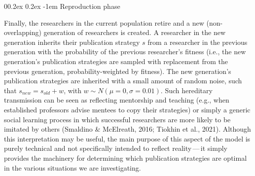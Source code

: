 \documentclass[
  ,man,mask,floatsintext]{apa6}
\makeatletter
\let\oldparagraph\paragraph
\renewcommand{\paragraph}[1]{\oldparagraph{#1}\mbox{}}
\renewcommand{\paragraph}{\@startsection{paragraph}{4}{\parindent}%
  {0\baselineskip \@plus 0.2ex \@minus 0.2ex}%
  {-1em}%
  {\normalfont\normalsize\bfseries\itshape\typesectitle}}
\makeatother
\begin{document}
\hypertarget{reproduction-phase}{%
\paragraph{Reproduction phase}\label{reproduction-phase}}

Finally, the researchers in the current population retire and a new (non-overlapping) generation of researchers is created.
A researcher in the new generation inherits their publication strategy \(s\) from a researcher in the previous generation with the probability of the previous researcher's fitness (i.e., the new generation's publication strategies are sampled with replacement from the previous generation, probability-weighted by fitness).
The new generation's publication strategies are inherited with a small amount of random noise, such that \(s_{new} = s_{old} + w\), with \(w \sim N(\mu = 0, \sigma = 0.01)\).
Such hereditary transmission can be seen as reflecting mentorship and teaching (e.g., when established professors advise mentees to copy their strategies) or simply a generic social learning process in which successful researchers are more likely to be imitated by others (Smaldino \& McElreath, 2016; Tiokhin et al., 2021).
Although this interpretation may be useful, the main purpose of this aspect of the model is purely technical and not specifically intended to reflect reality\(\,\)---\(\,\)it simply provides the machinery for determining which publication strategies are optimal in the various situations we are investigating.
\end{document}
